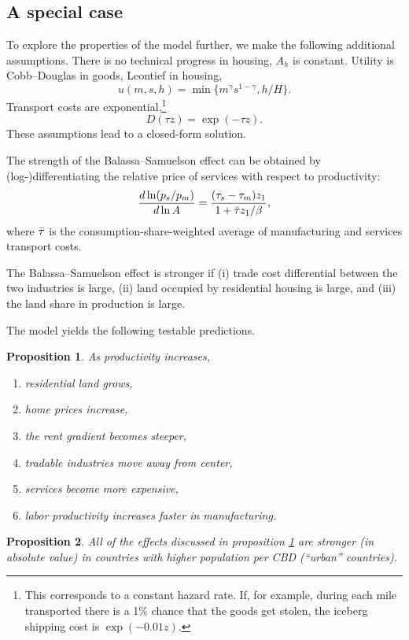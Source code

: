 \documentclass[12pt]{article}
\newtheorem{proposition}{Proposition}
\begin{document}
\subsection{A special case}
To explore the properties of the model further, we make the following additional assumptions.
There is no technical progress in housing, $A_h$ is constant. Utility is Cobb--Douglas in goods, Leontief in housing,
\[
u(m,s,h) = \min\{m^\gamma s^{1-\gamma} ,h/H\}.
\]
Transport costs are exponential,\footnote{This corresponds to a constant hazard rate. If, for example, during each mile transported there is a 1\% chance that the goods get stolen, the iceberg shipping cost is $\exp(-0.01 z)$.}
\[
D(\tau z) = \exp(-\tau z).
\]
These assumptions lead to a closed-form solution.

The strength of the Balassa--Samuelson effect can be obtained by (log-)differentiating the relative price of services with respect to productivity:
\begin{equation}\label{eq:bscs}
\frac{d\ln (p_s/p_m)}{d\ln A} = \frac{(\tau_s-\tau_m)z_1}{1+\Bar\tau z_1/\beta},
\end{equation}
where $\Bar\tau$ is the consumption-share-weighted average of manufacturing and services transport costs.

The Balassa--Samuelson effect is stronger if (i) trade cost differential between the two industries is large, (ii) land occupied by residential housing is large, and (iii) the land share in production is large.

The model yields the following testable predictions. 
\begin{proposition}\label{prop:compstat}
As productivity increases,
\begin{enumerate}
    \item residential land grows,
    \item home prices increase,
    \item the rent gradient becomes steeper,
    \item tradable industries move away from center,
    \item services become more expensive,
    \item labor productivity increases faster in manufacturing.
\end{enumerate}
\end{proposition}
\begin{proposition}
All of the effects discussed in proposition \ref{prop:compstat} are stronger (in absolute value) in countries with higher population per CBD (``urban'' countries).
\end{proposition}
\end{document}
